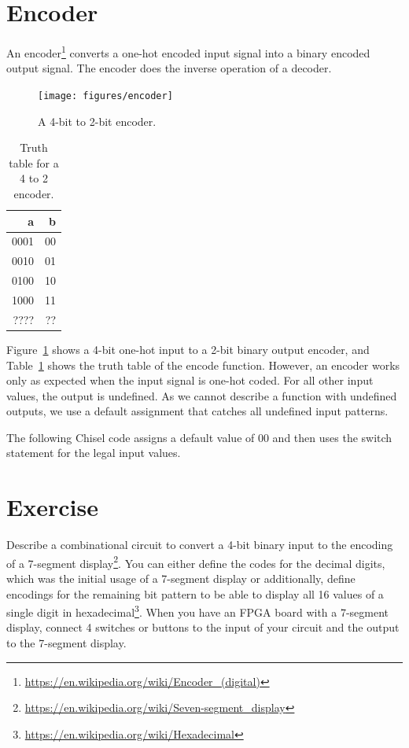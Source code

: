 \documentclass[%
    10pt,
    headinclude, footexclude,
    openright, %
    notitlepage,
    cleardoubleempty,
    headsepline,
    pointlessnumbers,
    bibtotoc, idxtotoc,
    ]{scrbook}
\newcommand{\myref}[2]{\href{#1}{#2}}
\renewcommand{\myref}[2]{{#2}{\footnote{\url{#1}}}}
\begin{document}
\section{Encoder}

An \myref{https://en.wikipedia.org/wiki/Encoder_(digital)}{encoder}
converts a one-hot encoded input signal into a binary encoded output signal.
The encoder does the inverse operation of a decoder.

\begin{figure}
  \centering
  \texttt{[image: figures/encoder]}
  \caption{A 4-bit to 2-bit encoder.}
  \label{fig:encoder}
\end{figure}


\begin{table}
 \centering
 \label{tab:encoder}
  \begin{tabular}{rr}
    \toprule
    a & b \\
    \midrule
    0001 & 00 \\
    0010 & 01 \\
    0100 & 10 \\
    1000 & 11 \\
    ???? & ?? \\
    \bottomrule 
  \end{tabular} 
  \caption{Truth table for a 4 to 2 encoder.}
\end{table}

Figure~\ref{fig:encoder} shows a 4-bit one-hot input to a 2-bit binary output encoder, and
Table~\ref{tab:encoder} shows the truth table of the encode function. However, an encoder
works only as expected when the input signal is one-hot coded. For all other input values, the output
is undefined. As we cannot describe a function with undefined outputs, we use a default
assignment that catches all undefined input patterns.

The following Chisel code assigns a default value of 00 and then uses the switch statement
for the legal input values.


\section{Exercise}

Describe a combinational circuit to convert a 4-bit binary input to the encoding of a
\myref{https://en.wikipedia.org/wiki/Seven-segment_display}{7-segment display}.
You can either define the codes for the decimal digits, which was the initial
usage of a 7-segment display or additionally, define encodings for the remaining bit pattern
to be able to display all 16 values of a single digit in
\myref{https://en.wikipedia.org/wiki/Hexadecimal}{hexadecimal}.
When you have an FPGA board with a 7-segment display, connect 4 switches or
buttons to the input of your circuit and the output to the 7-segment display.
\end{document}
